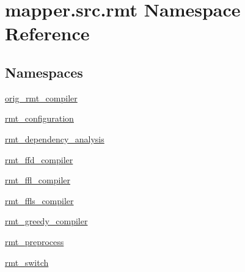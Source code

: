\hypertarget{namespacemapper_1_1src_1_1rmt}{}\section{mapper.\+src.\+rmt Namespace Reference}
\label{namespacemapper_1_1src_1_1rmt}
\subsection*{Namespaces}
\begin{DoxyCompactItemize}
\item 
 \hyperlink{namespacemapper_1_1src_1_1rmt_1_1orig__rmt__compiler}{orig\+\_\+rmt\+\_\+compiler}
\item 
 \hyperlink{namespacemapper_1_1src_1_1rmt_1_1rmt__configuration}{rmt\+\_\+configuration}
\item 
 \hyperlink{namespacemapper_1_1src_1_1rmt_1_1rmt__dependency__analysis}{rmt\+\_\+dependency\+\_\+analysis}
\item 
 \hyperlink{namespacemapper_1_1src_1_1rmt_1_1rmt__ffd__compiler}{rmt\+\_\+ffd\+\_\+compiler}
\item 
 \hyperlink{namespacemapper_1_1src_1_1rmt_1_1rmt__ffl__compiler}{rmt\+\_\+ffl\+\_\+compiler}
\item 
 \hyperlink{namespacemapper_1_1src_1_1rmt_1_1rmt__ffls__compiler}{rmt\+\_\+ffls\+\_\+compiler}
\item 
 \hyperlink{namespacemapper_1_1src_1_1rmt_1_1rmt__greedy__compiler}{rmt\+\_\+greedy\+\_\+compiler}
\item 
 \hyperlink{namespacemapper_1_1src_1_1rmt_1_1rmt__preprocess}{rmt\+\_\+preprocess}
\item 
 \hyperlink{namespacemapper_1_1src_1_1rmt_1_1rmt__switch}{rmt\+\_\+switch}
\end{DoxyCompactItemize}
